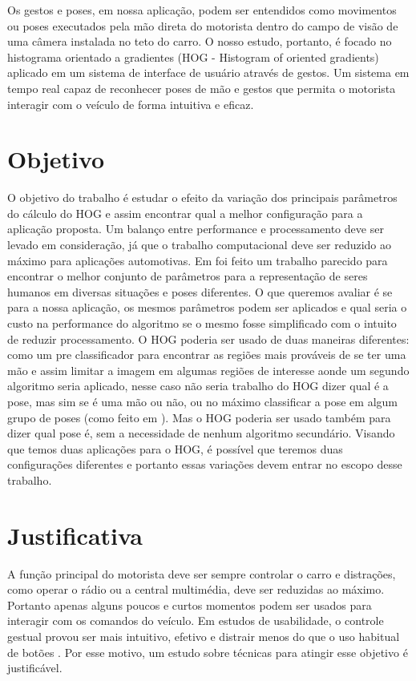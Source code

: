 Os gestos e poses, em nossa aplicação, podem ser entendidos como movimentos ou poses executados pela mão direta do motorista dentro do campo de visão de uma câmera instalada no teto do carro.
O nosso estudo, portanto, é focado no histograma orientado a gradientes (HOG - Histogram of oriented gradients) aplicado em um sistema de interface de usuário através de gestos. Um sistema em tempo real capaz de reconhecer poses de mão e gestos que permita o motorista interagir com o veículo de forma intuitiva e eficaz.


\section{Objetivo}

O objetivo do trabalho é estudar o efeito da variação dos principais parâmetros do cálculo do HOG e assim encontrar qual a melhor configuração para a aplicação proposta. Um balanço entre performance e processamento deve ser levado em consideração, já que o trabalho computacional deve ser reduzido ao máximo para aplicações automotivas.
Em \cite{dalal} foi feito um trabalho parecido para encontrar o melhor conjunto de parâmetros para a representação de seres humanos em diversas situações e poses diferentes. O que queremos avaliar é se para a nossa aplicação, os mesmos parâmetros podem ser aplicados e qual seria o custo na performance do algoritmo se o mesmo fosse simplificado com o intuito de reduzir processamento.
O HOG poderia ser usado de duas maneiras diferentes: como um pre classificador para encontrar as regiões mais prováveis de se ter uma mão e assim limitar a imagem em algumas regiões de interesse aonde um segundo algoritmo seria aplicado, nesse caso não seria trabalho do HOG dizer qual é a pose, mas sim se é uma mão ou não, ou no máximo classificar a pose em algum grupo de poses (como feito em \cite{ref10}). Mas o HOG poderia ser usado também para dizer qual pose é, sem a necessidade de nenhum algoritmo secundário.
Visando que temos duas aplicações para o HOG, é possível que teremos duas configurações diferentes e portanto essas variações devem entrar no escopo desse trabalho.

\section{Justificativa}

A função principal do motorista deve ser sempre controlar o carro e distrações, como operar o rádio ou a central multimédia, deve ser reduzidas ao máximo. Portanto apenas alguns poucos e curtos momentos podem ser usados para interagir com os comandos do veículo. Em estudos de usabilidade, o controle gestual provou ser mais intuitivo, efetivo \cite{ref12}  \cite{ref13} e distrair menos do que o uso habitual de botões \cite{ref14}. Por esse motivo, um estudo sobre técnicas para atingir esse objetivo é justificável.

